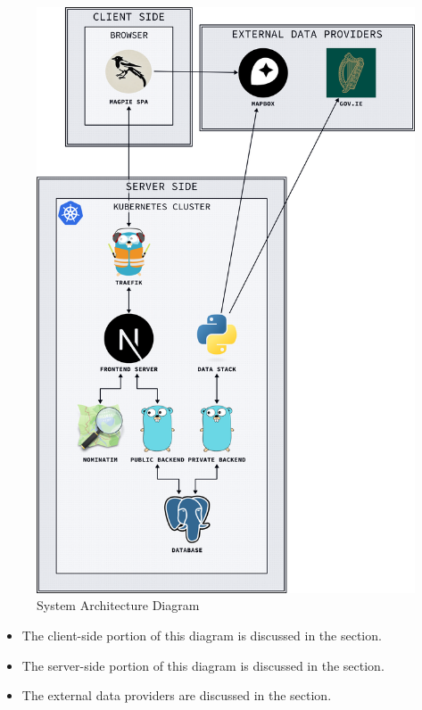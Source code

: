 \newpage{}

\begin{figure}[htbp]
  \centering{}
  \includegraphics[width=0.7\columnwidth]{../d2-diagrams/system-diagram/system-diagram-full.png}
  \caption{System Architecture Diagram}
  \label{fig:arcgis}
\end{figure}

\begin{itemize}
  \item The client-side portion of this diagram is discussed in the  section.
  \item The server-side portion of this diagram is discussed in the  section.
  \item The external data providers are discussed in the  section.
\end{itemize}

\newpage{}